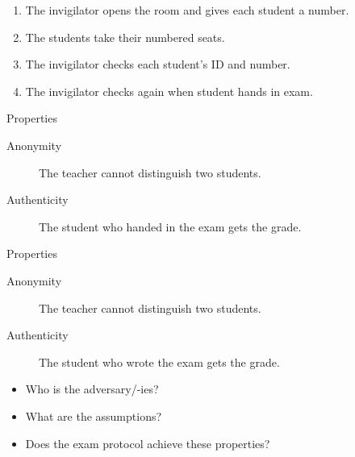 \begin{frame}
  \begin{example}[Exam]
    \begin{enumerate}
      \item The invigilator opens the room and gives each student a number.
      \item The students take their numbered seats.
      \item The invigilator checks each student's ID and number.
      \item The invigilator checks again when student hands in exam.
    \end{enumerate}
  \end{example}

  \pause

  \begin{block}{Properties}
    \begin{description}
      \item[Anonymity] The teacher cannot distinguish two students.
      \item[Authenticity] The student who handed in the exam gets the 
        grade.
    \end{description}
  \end{block}
\end{frame}

\begin{frame}
  \begin{block}{Properties}
    \begin{description}
      \item[Anonymity] The teacher cannot distinguish two students.
      \item[Authenticity] The student who wrote the exam gets the grade.
    \end{description}
  \end{block}

  \begin{exercise}
    \begin{itemize}
      \item Who is the adversary/-ies?
      \item What are the assumptions?
      \item Does the exam protocol achieve these properties?
    \end{itemize}
  \end{exercise}
\end{frame}

